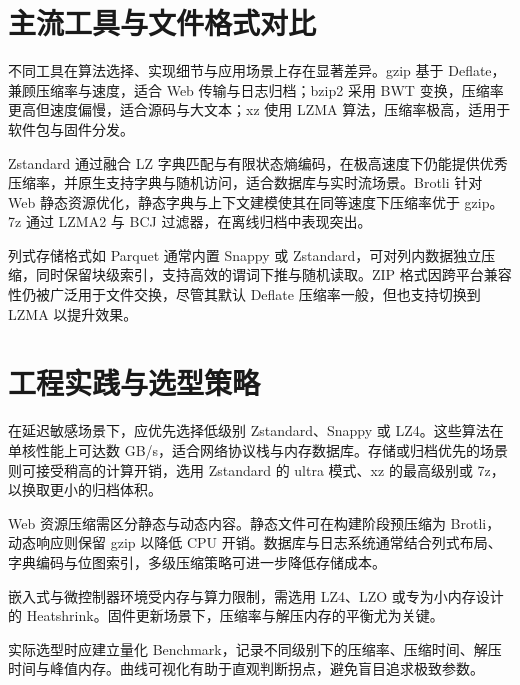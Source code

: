 \chapter{主流工具与文件格式对比}
不同工具在算法选择、实现细节与应用场景上存在显著差异。gzip 基于 Deflate，兼顾压缩率与速度，适合 Web 传输与日志归档；bzip2 采用 BWT 变换，压缩率更高但速度偏慢，适合源码与大文本；xz 使用 LZMA 算法，压缩率极高，适用于软件包与固件分发。\par
Zstandard 通过融合 LZ 字典匹配与有限状态熵编码，在极高速度下仍能提供优秀压缩率，并原生支持字典与随机访问，适合数据库与实时流场景。Brotli 针对 Web 静态资源优化，静态字典与上下文建模使其在同等速度下压缩率优于 gzip。7z 通过 LZMA2 与 BCJ 过滤器，在离线归档中表现突出。\par
列式存储格式如 Parquet 通常内置 Snappy 或 Zstandard，可对列内数据独立压缩，同时保留块级索引，支持高效的谓词下推与随机读取。ZIP 格式因跨平台兼容性仍被广泛用于文件交换，尽管其默认 Deflate 压缩率一般，但也支持切换到 LZMA 以提升效果。\par
\chapter{工程实践与选型策略}
在延迟敏感场景下，应优先选择低级别 Zstandard、Snappy 或 LZ4。这些算法在单核性能上可达数 GB/s，适合网络协议栈与内存数据库。存储或归档优先的场景则可接受稍高的计算开销，选用 Zstandard 的 ultra 模式、xz 的最高级别或 7z，以换取更小的归档体积。\par
Web 资源压缩需区分静态与动态内容。静态文件可在构建阶段预压缩为 Brotli，动态响应则保留 gzip 以降低 CPU 开销。数据库与日志系统通常结合列式布局、字典编码与位图索引，多级压缩策略可进一步降低存储成本。\par
嵌入式与微控制器环境受内存与算力限制，需选用 LZ4、LZO 或专为小内存设计的 Heatshrink。固件更新场景下，压缩率与解压内存的平衡尤为关键。\par
实际选型时应建立量化 Benchmark，记录不同级别下的压缩率、压缩时间、解压时间与峰值内存。曲线可视化有助于直观判断拐点，避免盲目追求极致参数。\par
